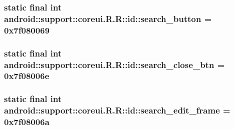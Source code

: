 \hypertarget{classandroid_1_1support_1_1coreui_1_1_r_1_1id_87cc49db9286edec0014b90f27ddd9e6}{
\subsubsection[{search\_\-button}]{\setlength{\rightskip}{0pt plus 5cm}static final int android::support::coreui.R.R::id::search\_\-button = 0x7f080069}}
\label{classandroid_1_1support_1_1coreui_1_1_r_1_1id_87cc49db9286edec0014b90f27ddd9e6}


\hypertarget{classandroid_1_1support_1_1coreui_1_1_r_1_1id_7b079c6e134ec67c2e902b290406ed6d}{
\subsubsection[{search\_\-close\_\-btn}]{\setlength{\rightskip}{0pt plus 5cm}static final int android::support::coreui.R.R::id::search\_\-close\_\-btn = 0x7f08006e}}
\label{classandroid_1_1support_1_1coreui_1_1_r_1_1id_7b079c6e134ec67c2e902b290406ed6d}


\hypertarget{classandroid_1_1support_1_1coreui_1_1_r_1_1id_1206f1ada8c7226cf1185018ca7adb21}{
\subsubsection[{search\_\-edit\_\-frame}]{\setlength{\rightskip}{0pt plus 5cm}static final int android::support::coreui.R.R::id::search\_\-edit\_\-frame = 0x7f08006a}}
\label{classandroid_1_1support_1_1coreui_1_1_r_1_1id_1206f1ada8c7226cf1185018ca7adb21}


